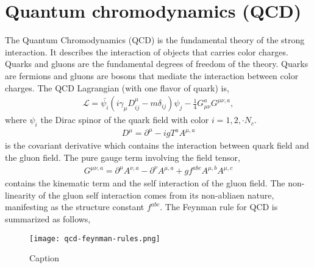 \section{Quantum chromodynamics (QCD)}
The Quantum Chromodynamics (QCD) is the fundamental theory of the strong interaction.
It describes the interaction of objects that carries color charges. 
Quarks and gluons are the fundamental degrees of freedom of the theory. 
Quarks are fermions and gluons are bosons that mediate the interaction between color charges.
The QCD Lagrangian (with one flavor of quark) is,
\begin{eqnarray}
\mathcal{L} = \bar{\psi_i} \left(i\gamma_\mu D^\mu_{ij} -m \delta_{ij} \right)\psi_j - \frac{1}{4}G_{\mu\nu}^a G^{\mu\nu,a},
\end{eqnarray}
where $\psi_i$ the Dirac spinor of the quark field with color $i = 1,2,\cdot N_c$. 
\begin{eqnarray}
D^\mu = \partial^\mu - i g T^a A^{\mu, a}
\end{eqnarray}
is the covariant derivative which contains the interaction between quark field and the gluon field.
The pure gauge term involving the field tensor,
\begin{eqnarray}
G^{\mu\nu,a} = \partial^\mu A^{\nu, a} - \partial^\nu A^{\mu, a} + g f^{abc} A^{\mu,b}A^{\mu,c}
\end{eqnarray}
contains the kinematic term and the self interaction of the gluon field.
The non-linearity of the gluon self interaction comes from its non-abliaen nature, manifesting as the structure constant $f^{abc}$.
The Feynman rule for QCD is summarized as follows,
\begin{figure}
    \centering
    \texttt{[image: qcd-feynman-rules.png]}
    \caption{Caption}
    \label{fig:qcd-feynman}
\end{figure}

